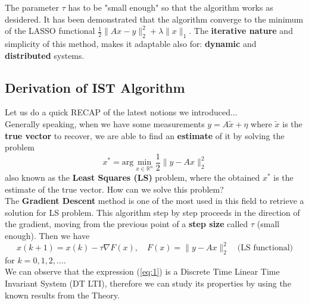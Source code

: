 \hspace*{-5mm}
%

\vspace{0.5cm}
\noindent
The parameter $\tau$ has to be "small enough" so that the algorithm works as desidered. It has been demonstrated that the algorithm converge to the minimum of the LASSO functional $\frac{1}{2}\lVert Ax-y \rVert_2^2+\lambda\lVert x \rVert_1$. The \textbf{iterative nature} and simplicity of this method, makes it adaptable also for: \textbf{dynamic} and \textbf{distributed} systems.

\subsection{Derivation of IST Algorithm} 
Let us do a quick RECAP of the latest notions we introduced...\\
Generally speaking, when we have some measurements $y=A\tilde{x}+\eta$ where $\tilde{x}$ is the \textbf{true vector} to recover, we are able to find an \textbf{estimate} of it by solving the problem 
$$x^{*} = \textrm{arg} \min_{x\in \mathbb{R}^n} \frac{1}{2}\lVert y-Ax \rVert_{2}^{2}$$
also known as the \textbf{Least Squares (LS)} problem, where the obtained $x^*$ is the estimate of the true vector. How can we solve this problem?\\
The \textbf{Gradient Descent} method is one of the most used in this field to retrieve a solution for LS problem. This algorithm step by step proceeds in the direction of the gradient, moving from the previous point of a \textbf{step size} called $\tau$ (small enough). Then we have 
\begin{equation} 
\label{eq:1}
    x(k+1)=x(k)-\tau \nabla{F(x)}, \quad F(x)= \lVert y-Ax \rVert_2^{2} \quad \textrm{(LS functional)}
\end{equation}
 for $k=0,1, 2, ....$  \\
We can observe that the expression (\ref{eq:1}) is a Discrete Time Linear Time Invariant System (DT LTI), therefore we can study its properties by using the known results from the Theory.\\

